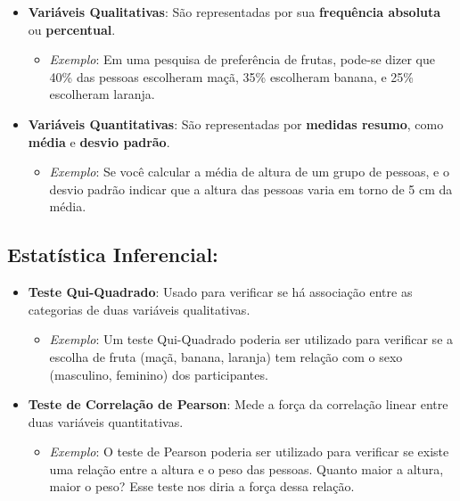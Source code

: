\documentclass[
]{book}
\providecommand{\tightlist}{%
  \setlength{\itemsep}{0pt}\setlength{\parskip}{0pt}}
\begin{document}
\begin{itemize}
\tightlist
\item
  \textbf{Variáveis Qualitativas}: São representadas por sua \textbf{frequência absoluta} ou \textbf{percentual}.

  \begin{itemize}
  \tightlist
  \item
    \emph{Exemplo}: Em uma pesquisa de preferência de frutas, pode-se dizer que 40\% das pessoas escolheram maçã, 35\% escolheram banana, e 25\% escolheram laranja.
  \end{itemize}
\item
  \textbf{Variáveis Quantitativas}: São representadas por \textbf{medidas resumo}, como \textbf{média} e \textbf{desvio padrão}.

  \begin{itemize}
  \tightlist
  \item
    \emph{Exemplo}: Se você calcular a média de altura de um grupo de pessoas, e o desvio padrão indicar que a altura das pessoas varia em torno de 5 cm da média.
  \end{itemize}
\end{itemize}

\subsection{Estatística Inferencial:}\label{estatuxedstica-inferencial-1}

\begin{itemize}
\tightlist
\item
  \textbf{Teste Qui-Quadrado}: Usado para verificar se há associação entre as categorias de duas variáveis qualitativas.

  \begin{itemize}
  \tightlist
  \item
    \emph{Exemplo}: Um teste Qui-Quadrado poderia ser utilizado para verificar se a escolha de fruta (maçã, banana, laranja) tem relação com o sexo (masculino, feminino) dos participantes.
  \end{itemize}
\item
  \textbf{Teste de Correlação de Pearson}: Mede a força da correlação linear entre duas variáveis quantitativas.

  \begin{itemize}
  \tightlist
  \item
    \emph{Exemplo}: O teste de Pearson poderia ser utilizado para verificar se existe uma relação entre a altura e o peso das pessoas. Quanto maior a altura, maior o peso? Esse teste nos diria a força dessa relação.
  \end{itemize}
\end{itemize}
\end{document}
